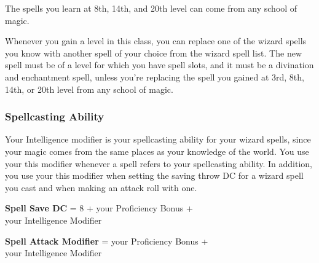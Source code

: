 \documentclass[letterpaper,openany,twoside,twocolumn]{book}
\begin{document}
	The spells you learn at 8th, 14th, and 20th level can come from any school of magic.
	
	Whenever you gain a level in this class, you can replace one of the wizard spells you know with another spell of your choice from the wizard spell list. The new spell must be of a level for which you have spell slots, and it must be a divination and enchantment spell, unless you’re replacing the spell you gained at 3rd, 8th, 14th, or 20th level from any school of magic.
	
	\subsubsection*{Spellcasting Ability}
	Your Intelligence modifier is your spellcasting ability for your wizard spells, since your magic comes from the same places as your knowledge of the world. You use your this modifier whenever a spell refers to your spellcasting ability. In addition, you use your this modifier when setting the saving throw DC for a wizard spell you cast and when making an attack roll with one.
	
	\begin{center}
		\textbf{Spell Save DC} = 8 + your Proficiency Bonus + \\your Intelligence Modifier
	\end{center}
	\begin{center}
		\textbf{Spell Attack Modifier} = your Proficiency Bonus + \\your Intelligence Modifier
	\end{center}
	
\end{document}
